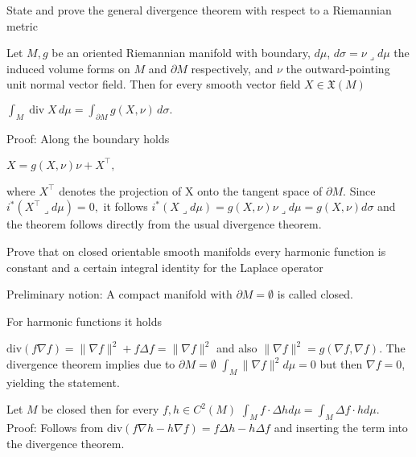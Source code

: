 State and prove the general divergence theorem with respect to a Riemannian metric

Let \(M, g\) be an oriented Riemannian manifold with boundary, \(d \mu\), \(d \sigma = \nu \lrcorner d\mu\) 
the induced volume forms on \(M\) and \(\partial M\) respectively, and \(\nu\) the outward-pointing unit normal vector field. 
Then for every smooth vector field \(X \in \mathfrak{X}(M)\)

\(\int_M \operatorname{div} X \, d\mu = \int_{\partial M} g(X, \nu) \, d\sigma.\)

Proof: Along the boundary holds 

\(X = g(X, \nu) \nu + X^\top,\)

where \(X^\top\) denotes the projection of X onto the tangent space of \(\partial M\).
Since
\(i^*(X^\top \lrcorner d\mu) = 0,\)
it follows
\(i^*(X \lrcorner d\mu) = g(X, \nu) \nu \lrcorner d\mu = g(X, \nu) d\sigma\)
and the theorem follows directly from the usual divergence theorem.


Prove that on closed orientable smooth manifolds every harmonic function is constant
and a certain integral identity for the Laplace operator

Preliminary notion: A compact manifold with \( \partial M = \emptyset \) is called closed.

For harmonic functions it holds

\( \text{div}(f \nabla f) = \|\nabla f\|^2 + f \Delta f = \|\nabla f\|^2 \)
and also \( \|\nabla f\|^2 = g(\nabla f, \nabla f) \).
The divergence theorem implies due to \( \partial M = \emptyset \)
\( \int_M \|\nabla f\|^2 d\mu = 0 \) but then \( \nabla f = 0 \), yielding the statement.

Let \( M \) be closed then for every \( f, h \in C^2(M) \)
\( \int_M f \cdot \Delta h d\mu = \int_M \Delta f \cdot h d\mu \).
Proof: Follows from \( \text{div}(f \nabla h - h \nabla f) = f\Delta h - h\Delta f \) and inserting the term into the divergence theorem.
